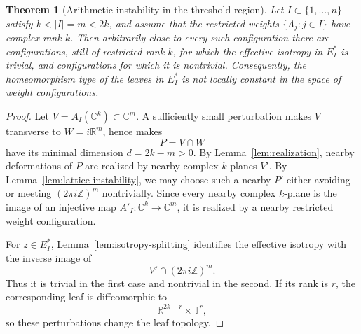\documentclass[11pt]{amsart}
\newtheorem{theorem}{Theorem}[section]
\theoremstyle{definition}
\newtheorem{definition}[theorem]{Definition}
\theoremstyle{remark}
\newcommand{\Z}{\mathbb{Z}}
\newcommand{\C}{\mathbb{C}}
\newcommand{\R}{\mathbb{R}}
\newcommand{\T}{\mathbb{T}}
\newcommand{\stratSS}[1]{E_{#1}^*}
\begin{document}
\begin{theorem}[Arithmetic instability in the threshold region]
	\label{thm:arithmetic-instability}
	Let $I\subset\{1,\dots,n\}$ satisfy $k<|I|=m<2k$, and assume that the restricted weights $\{\Lambda_j:j\in I\}$ have complex rank $k$.
	Then arbitrarily close to every such configuration there are configurations, still of restricted rank $k$, for which the effective isotropy in $\stratSS{I}$ is trivial, and configurations for which it is nontrivial.
	Consequently, the homeomorphism type of the leaves in $\stratSS{I}$ is not locally constant in the space of weight configurations.
\end{theorem}

\begin{proof}
	Let $V=A_I(\C^k)\subset\C^m$.
	A sufficiently small perturbation makes $V$ transverse to $W=i\R^m$, hence makes
	\[
		P=V\cap W
	\]
	have its minimal dimension $d=2k-m>0$.
	By Lemma~\ref{lem:realization}, nearby deformations of $P$ are realized by nearby complex $k$-planes $V'$.
	By Lemma~\ref{lem:lattice-instability}, we may choose such a nearby $P'$ either avoiding or meeting $(2\pi i\Z)^m$ nontrivially.
	Since every nearby complex $k$-plane is the image of an injective map $A'_I:\C^k\to\C^m$, it is realized by a nearby restricted weight configuration.

	For $z\in\stratSS{I}$, Lemma~\ref{lem:isotropy-splitting} identifies the effective isotropy with the inverse image of
	\[
		V'\cap(2\pi i\Z)^m.
	\]
	Thus it is trivial in the first case and nontrivial in the second.
	If its rank is $r$, the corresponding leaf is diffeomorphic to
	\[
		\R^{2k-r}\times\T^r,
	\]
	so these perturbations change the leaf topology.
\end{proof}

%	
%
%
%
%
\end{document}
